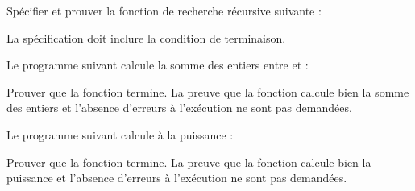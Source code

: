 

Spécifier et prouver la fonction de recherche récursive suivante :




La spécification doit inclure la condition de terminaison.




Le programme suivant calcule la somme des entiers entre  et
:




Prouver que la fonction termine. La preuve que la fonction calcule bien la
somme des entiers et l'absence d'erreurs à l'exécution ne sont pas demandées.




Le programme suivant calcule  à la puissance :




Prouver que la fonction termine. La preuve que la fonction calcule bien la
puissance et l'absence d'erreurs à l'exécution ne sont pas demandées.
